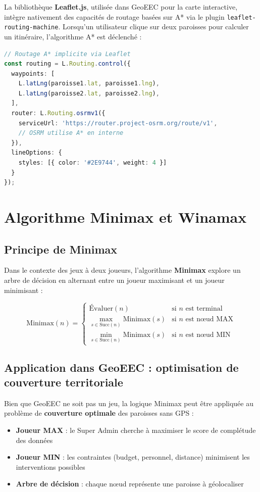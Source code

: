 \documentclass[12pt, a4paper]{report}
\theoremstyle{definition}
\begin{document}
La bibliothèque \textbf{Leaflet.js}, utilisée dans GeoEEC pour la carte interactive, intègre nativement des capacités de routage basées sur A* via le plugin \texttt{leaflet-routing-machine}. Lorsqu'un utilisateur clique sur deux paroisses pour calculer un itinéraire, l'algorithme A* est déclenché :

\begin{lstlisting}[language=TypeScript, caption=Intégration A* via Leaflet dans LandingMap.tsx]
// Routage A* implicite via Leaflet
const routing = L.Routing.control({
  waypoints: [
    L.latLng(paroisse1.lat, paroisse1.lng),
    L.latLng(paroisse2.lat, paroisse2.lng),
  ],
  router: L.Routing.osrmv1({
    serviceUrl: 'https://router.project-osrm.org/route/v1',
    // OSRM utilise A* en interne
  }),
  lineOptions: {
    styles: [{ color: '#2E9744', weight: 4 }]
  }
});
\end{lstlisting}

\section{Algorithme Minimax et Winamax}

\subsection{Principe de Minimax}

Dans le contexte des jeux à deux joueurs, l'algorithme \textbf{Minimax} explore un arbre de décision en alternant entre un joueur maximisant et un joueur minimisant :

$$\text{Minimax}(n) = \begin{cases}
\text{Évaluer}(n) & \text{si } n \text{ est terminal} \\
\max_{s \in \text{Succ}(n)} \text{Minimax}(s) & \text{si } n \text{ est nœud MAX} \\
\min_{s \in \text{Succ}(n)} \text{Minimax}(s) & \text{si } n \text{ est nœud MIN}
\end{cases}$$

\subsection{Application dans GeoEEC : optimisation de couverture territoriale}

Bien que GeoEEC ne soit pas un jeu, la logique Minimax peut être appliquée au problème de \textbf{couverture optimale} des paroisses sans GPS :

\begin{itemize}
  \item \textbf{Joueur MAX} : le Super Admin cherche à maximiser le score de complétude des données
  \item \textbf{Joueur MIN} : les contraintes (budget, personnel, distance) minimisent les interventions possibles
  \item \textbf{Arbre de décision} : chaque nœud représente une paroisse à géolocaliser
\end{itemize}
\end{document}

